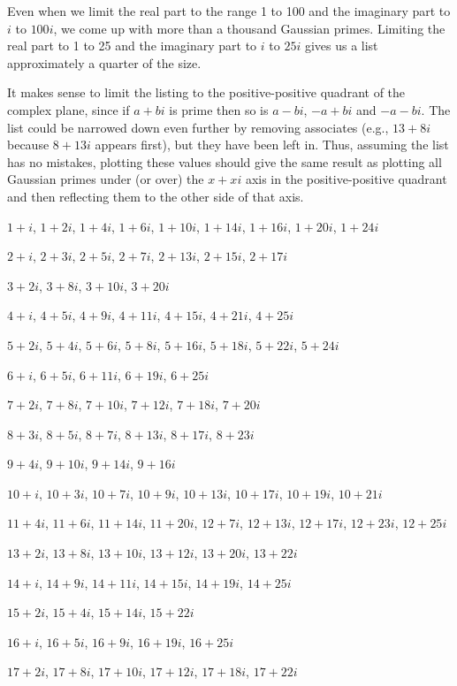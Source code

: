 \documentclass[12pt]{article}
\begin{document}
Even when we limit the real part to the range 1 to 100 and the imaginary part to $i$ to $100i$, we come up with more than a thousand Gaussian primes. Limiting the real part to 1 to 25 and the imaginary part to $i$ to $25i$ gives us a list approximately a quarter of the size.

It makes sense to limit the listing to the positive-positive quadrant of the complex plane, since if $a + bi$ is prime then so is $a - bi$, $-a + bi$ and $-a - bi$. The list could be narrowed down even further by removing associates (e.g., $13 + 8i$ because $8 + 13i$ appears first), but they have been left in. Thus, assuming the list has no mistakes, plotting these values should give the same result as plotting all Gaussian primes under (or over) the $x + xi$ axis in the positive-positive quadrant and then reflecting them to the other side of that axis.

$1 + i$, $1 + 2i$, $1 + 4i$, $1 + 6i$, $1 + 10i$, $1 + 14i$, $1 + 16i$, $1 + 20i$, $1 + 24i$

$2 + i$, $2 + 3i$, $2 + 5i$, $2 + 7i$, $2 + 13i$, $2 + 15i$, $2 + 17i$

$3 + 2i$, $3 + 8i$, $3 + 10i$, $3 + 20i$

$4 + i$, $4 + 5i$, $4 + 9i$, $4 + 11i$, $4 + 15i$, $4 + 21i$, $4 + 25i$

$5 + 2i$, $5 + 4i$, $5 + 6i$, $5 + 8i$, $5 + 16i$, $5 + 18i$, $5 + 22i$, $5 + 24i$

$6 + i$, $6 + 5i$, $6 + 11i$, $6 + 19i$, $6 + 25i$

$7 + 2i$, $7 + 8i$, $7 + 10i$, $7 + 12i$, $7 + 18i$, $7 + 20i$

$8 + 3i$, $8 + 5i$, $8 + 7i$, $8 + 13i$, $8 + 17i$, $8 + 23i$

$9 + 4i$, $9 + 10i$, $9 + 14i$, $9 + 16i$

$10 + i$, $10 + 3i$, $10 + 7i$, $10 + 9i$, $10 + 13i$, $10 + 17i$, $10 + 19i$, $10 + 21i$

$11 + 4i$, $11 + 6i$, $11 + 14i$, $11 + 20i$, $12 + 7i$, $12 + 13i$, $12 + 17i$, $12 + 23i$, $12 + 25i$

$13 + 2i$, $13 + 8i$, $13 + 10i$, $13 + 12i$, $13 + 20i$, $13 + 22i$

$14 + i$, $14 + 9i$, $14 + 11i$, $14 + 15i$, $14 + 19i$, $14 + 25i$

$15 + 2i$, $15 + 4i$, $15 + 14i$, $15 + 22i$

$16 + i$, $16 + 5i$, $16 + 9i$, $16 + 19i$, $16 + 25i$

$17 + 2i$, $17 + 8i$, $17 + 10i$, $17 + 12i$, $17 + 18i$, $17 + 22i$
\end{document}
